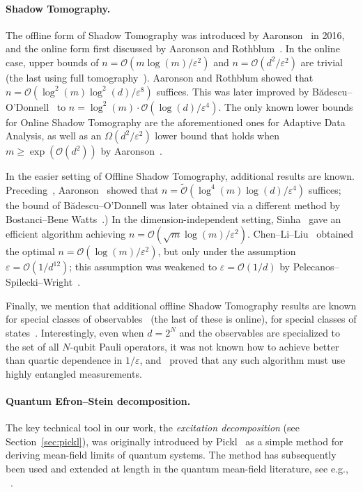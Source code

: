 \documentclass[10pt]{article}
\newcommand{\eps}{\epsilon}
\newcommand{\wt}[1]{\widetilde{#1}}
\renewcommand{\epsilon}{\varepsilon}
\begin{document}
\paragraph{Shadow Tomography.}
The offline form of Shadow Tomography was introduced by Aaronson~\cite{Aar16} in 2016, and the online form first discussed by Aaronson and Rothblum~\cite{aaronson2019gentle}.  In the online case, upper bounds of $n = \mathcal{O}(m\log(m)/\eps^2)$ and $n = \mathcal{O}(d^2/\eps^2)$ are trivial (the last using full tomography~\cite{OW16,HHJWY17}).  Aaronson and Rothblum showed that $n = \mathcal{O}(\log^2(m) \log^2(d)/\eps^8)$ suffices.  This was later improved by B\u{a}descu--O'Donnell~\cite{BO24} to $n = \log^2(m) \cdot \mathcal{O}(\log(d)/\eps^4)$. 
The only known lower bounds for Online Shadow Tomography are the aforementioned ones for Adaptive Data Analysis, as well as an $\Omega(d^2/\eps^2)$ lower bound that holds when $m \geq \exp(\mathcal{O}(d^2))$ by Aaronson~\cite{Aar20}.

In the easier setting of Offline Shadow Tomography,  additional results are known.    Preceding~\cite{BO24}, Aaronson~\cite{Aar20} showed that $n = \wt{\mathcal{O}}(\log^4(m) \log(d)/\eps^4)$ suffices; the bound of B\u{a}descu--O'Donnell was later obtained via a different method by Bostanci--Bene{ }Watts~\cite{BB24}.)  In the dimension-independent setting, Sinha~\cite{Sin25} gave an efficient algorithm achieving $n = \mathcal{O}(\sqrt{m} \log(m)/\eps^2)$.  Chen--Li--Liu~\cite{chen2024optimal} obtained the optimal $n = \mathcal{O}(\log(m)/\eps^2)$, but only under the assumption $\eps = \mathcal{O}(1/d^{12})$; this assumption was weakened to $\eps = \mathcal{O}(1/d)$ by Pelecanos--Spilecki--Wright~\cite{PSW26}.

Finally, we mention that additional offline Shadow Tomography results are known for special classes of observables~\cite{HKP20,CGY24,KGKB25,HLHP26} (the last of these is online), for special classes of states~\cite{GPS24,CG26}. Interestingly, even when $d = 2^N$ and the observables are specialized to the set of all $N$-qubit Pauli operators, it was not known how to achieve better than quartic dependence in $1/\epsilon$, and~\cite{CGY24} proved that any such algorithm must use highly entangled measurements.



\paragraph{Quantum Efron--Stein decomposition.} The key technical tool in our work, the \emph{excitation decomposition} (see Section~\ref{sec:pickl}), was originally introduced by Pickl~\cite{pickl2011simple} as a simple method for deriving mean-field limits of quantum systems. The method has subsequently been used and extended at length in the quantum mean-field literature, see e.g., ~\cite{knowles2010mean,lewin2015bogoliubov,lewin2015fluctuations,pickl2015derivation}.
\end{document}
